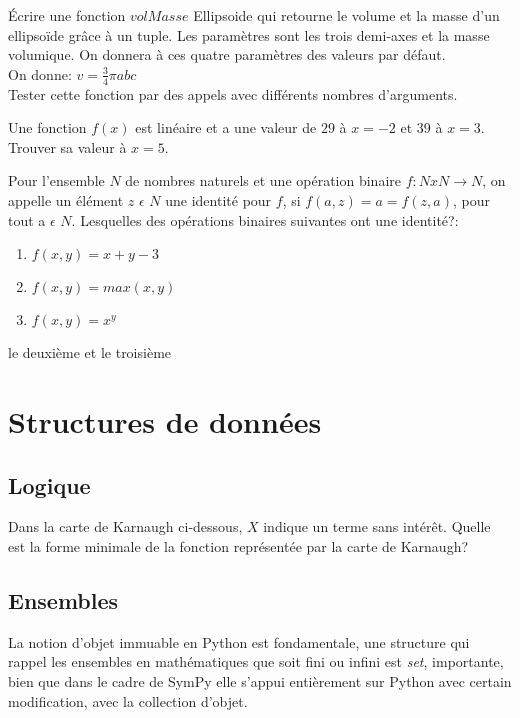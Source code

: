 \documentclass[11pt,fleqn]{book} %
\begin{document}
\begin{exercise}
Écrire une fonction $volMasse$ Ellipsoide qui retourne le volume et la masse d’un ellipsoïde grâce à un tuple. Les paramètres sont les trois demi-axes et la masse volumique. On donnera à ces quatre paramètres des valeurs par défaut. \\
On donne: $v = \frac{3}{4} \pi abc$ \\
Tester cette fonction par des appels avec différents nombres d’arguments.
\end{exercise}

\begin{exercise}
Une fonction $f (x)$ est lin\'eaire et a une valeur de $29$ \`a $x = -2$ et $39$ à $x = 3$. Trouver sa valeur à $x = 5$.
\end{exercise}

\begin{exercise}
Pour l'ensemble $N$ de nombres naturels et une opération binaire $f: N x N \longrightarrow N$, on appelle un élément $z$ $\epsilon$ $N$ une identité pour $f$, si $f (a, z) = a = f (z, a)$, pour tout a $\epsilon$ $N$. Lesquelles des opérations binaires suivantes ont une identité?:
\begin{enumerate}
  \item $f (x, y) = x + y - 3$
  \item $f (x, y) = max(x, y)$
  \item $f (x, y) = x^{y}$
\end{enumerate}
\end{exercise}
\begin{solution}
le deuxième et le troisième 
\end{solution}
\section{Structures de données}

\subsection{Logique}
\begin{exercise}
Dans la carte de Karnaugh ci-dessous, $X$ indique un terme sans intérêt. Quelle est la forme minimale de la fonction représentée par la carte de Karnaugh?
\end{exercise}
\subsection{Ensembles}
La notion d'objet immuable en Python est fondamentale,  une structure qui rappel les ensembles en mathématiques que soit fini ou infini est \textit{set}, importante, bien que
dans le cadre de SymPy elle s'appui entièrement sur Python avec certain modification, avec la collection d'objet.
\\
\end{document}
